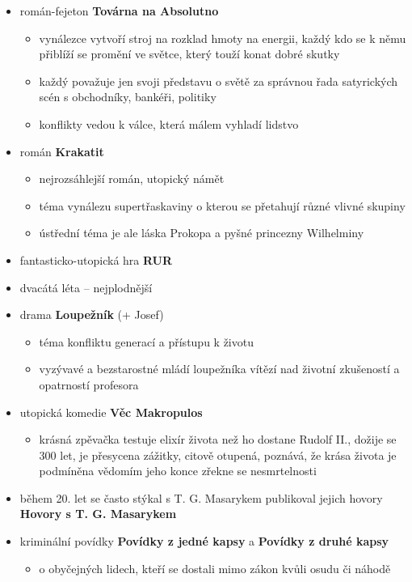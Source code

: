\begin{itemize}
\item román-fejeton \textbf{Továrna na Absolutno}
	\begin{itemize}
	\item vynálezce vytvoří stroj na rozklad hmoty na energii, každý kdo se k němu přiblíží se promění ve světce, který touží konat dobré skutky
	\item každý považuje jen svoji představu o světě za správnou \ra řada satyrických scén s obchodníky, bankéři, politiky
	\item konflikty vedou k válce, která málem vyhladí lidstvo
	\end{itemize}
	
\item román \textbf{Krakatit}
	\begin{itemize}
	\item nejrozsáhlejší román, utopický námět
	\item téma vynálezu supertřaskaviny o kterou se přetahují různé vlivné skupiny
	\item ústřední téma je ale láska Prokopa a pyšné princezny Wilhelminy
	\end{itemize}

\item fantasticko-utopická hra \textbf{RUR}
\item dvacátá léta -- nejplodnější
\item drama \textbf{Loupežník} (+ Josef)
	\begin{itemize}
	\item téma konfliktu generací a přístupu k životu
	\item vyzývavé a bezstarostné mládí loupežníka vítězí nad životní zkušeností a opatrností profesora
	\end{itemize}

\item utopická komedie \textbf{Věc Makropulos}
	\begin{itemize}
	\item krásná zpěvačka testuje elixír života než ho dostane Rudolf II., dožije se 300 let, je přesycena zážitky, citově otupená, poznává, že krása života je podmíněna vědomím jeho konce \ra zřekne se nesmrtelnosti
	\end{itemize}
\item během 20. let se často stýkal s T. G. Masarykem \ra publikoval jejich hovory \textbf{Hovory s T. G. Masarykem}
\item kriminální povídky \textbf{Povídky z jedné kapsy} a \textbf{Povídky z druhé kapsy}
	\begin{itemize}
	\item o obyčejných lidech, kteří se dostali mimo zákon kvůli osudu či náhodě
	\end{itemize}


\end{itemize}
